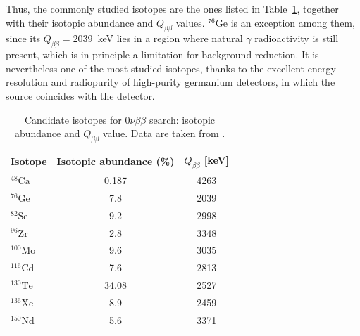 Thus, the commonly studied isotopes are the ones listed in Table~\ref{tab:isotopes-for-0nu}, together with their isotopic abundance and $Q_{\beta\beta}$ values. ${}^{76}$Ge is an exception among them, since its $Q_{\beta\beta} = 2039$~keV lies in a region where natural $\gamma$ radioactivity is still present, which is in principle a limitation for background reduction. It is nevertheless one of the most studied isotopes, thanks to the excellent energy resolution and radiopurity of high-purity germanium detectors, in which the source coincides with the detector.

\begin{table}[H]
    \centering
    \begin{tabular}{lcc}
        \toprule
        Isotope & Isotopic abundance (\%) & $Q_{\beta\beta}$ [keV] \\
        \midrule
        ${}^{48}\text{Ca}$  & 0.187 & 4263 \\
        \rowcolor{greyblue}
        ${}^{76}\text{Ge}$  & 7.8   & 2039 \\
        ${}^{82}\text{Se}$  & 9.2   & 2998 \\
        ${}^{96}\text{Zr}$  & 2.8   & 3348 \\
        ${}^{100}\text{Mo}$ & 9.6   & 3035 \\
        ${}^{116}\text{Cd}$ & 7.6   & 2813 \\
        ${}^{130}\text{Te}$ & 34.08 & 2527 \\
        ${}^{136}\text{Xe}$ & 8.9   & 2459 \\
        ${}^{150}\text{Nd}$ & 5.6   & 3371 \\
        \bottomrule
    \end{tabular}
    \caption{Candidate isotopes for $0\nu\beta\beta$ search: isotopic abundance and $Q_{\beta\beta}$ value. Data are taken from \cite{review-0nu-2015}.}
    \label{tab:isotopes-for-0nu}
\end{table}

